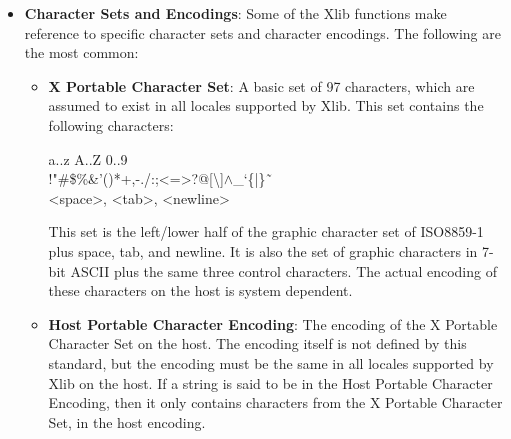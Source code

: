 \documentclass{report}
\begin{document}
\begin{itemize}
\begin{itemize}
                \item Keyboards are the greatest variable between different manufacturers’ workstations. If you want your program to be portable, you should be particularly conservative here.
                \item Many display systems have limited amounts of off-screen memory. If you can, you should minimize use of pixmaps and backing store.
                \item The user should have control of his screen real estate. Therefore, you should write your applications to react to window management rather than presume control of the entire screen. What you do inside of your top-level window, however, is up to your application. For further information, see chapter 14 and the Inter-Client Communication Conventions
            \end{itemize}
        \item \textbf{Character Sets and Encodings}: Some of the Xlib functions make reference to specific character sets and character encodings. The following are the most common:
            \begin{itemize}
                \item \textbf{X Portable Character Set}: A basic set of 97 characters, which are assumed to exist in all locales supported by Xlib. This set contains the following characters:
                    \begin{center}
                        a..z \hspace{1em} A..Z \hspace{1em} 0..9 \\
                        !"\#\$\%\&’()*+,-./:;<=>?@[\textbackslash]$\land$\_‘\{|\}˜ \\
                        <space>, \hspace{1em} <tab>, \hspace{1em} <newline>
                    \end{center}
                    This set is the left/lower half of the graphic character set of ISO8859-1 plus space, tab, and newline. It is also the set of graphic characters in 7-bit ASCII plus the same three control characters. The actual encoding of these characters on the host is system dependent.
                \item \textbf{Host Portable Character Encoding}: The encoding of the X Portable Character Set on the host. The encoding itself is not defined by this standard, but the encoding must be the same in all locales supported by Xlib on the host. If a string is said to be in the Host Portable Character Encoding, then it only contains characters from the X Portable Character Set, in the host encoding.

\end{itemize}
\end{itemize}
\end{document}
